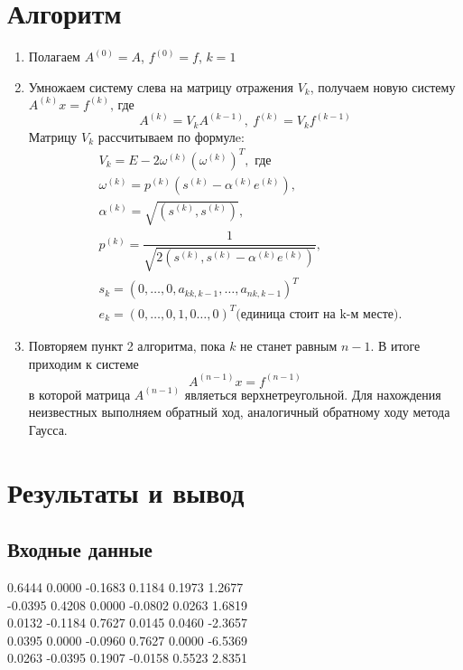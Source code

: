 \documentclass[11.4pt]{article}
\begin{document}
\section{Алгоритм}
\begin{enumerate}
	\item Полагаем $A^{(0)} = A$, $f^{(0)} = f$, $k = 1$
	\item Умножаем систему слева на матрицу отражения $V_k$, получаем новую систему $A^{(k)}x=f^{(k)}\text{, где}$
		\[A^{(k)} = V_kA^{(k-1)}, \: f^{(k)} = V_kf^{(k-1)}\]
		Матрицу $V_k$ рассчитываем по формулe:
		\begin{equation*}
			\begin{aligned}
				&V_k = E - 2\omega^{(k)} (\omega^{(k)})^{T}, \text{ где}\\
				&\omega^{(k)} = p^{(k)}(s^{(k)}-\alpha^{(k)} e^{(k)}),\\
				&\alpha^{(k)} =\sqrt{(s^{(k)}, s^{(k)})},\\
				&p^{(k)}=\dfrac{1}{\sqrt{2(s^{(k)}, s^{(k)}-\alpha^{(k)} e^{(k)})}},\\
				&s_k=(0,\ldots,0, a_{kk,k-1},\ldots,a_{nk,k-1})^T \\ &e_k=(0,\ldots,0,1,0\ldots, 0)^T  \text{(единица стоит на k-м месте)}.
			\end{aligned}
		\end{equation*}
	\item Повторяем пункт 2 алгоритма, пока $k$ не станет равным $n-1$. В итоге приходим к системе
	\[A^{(n-1)}x=f^{(n-1)}\] в которой матрица $A^{(n-1)}$ являеться верхнетреугольной.
	 Для нахождения неизвестных выполняем обратный ход, аналогичный обратному ходу метода Гаусса. 
\end{enumerate}
\section{Результаты и вывод}
	\subsection{Входные данные}
		0.6444 0.0000 -0.1683 0.1184 0.1973 1.2677\\
		-0.0395 0.4208 0.0000 -0.0802 0.0263 1.6819\\
		0.0132 -0.1184 0.7627 0.0145 0.0460 -2.3657\\
		0.0395 0.0000 -0.0960 0.7627 0.0000 -6.5369\\
		0.0263 -0.0395 0.1907 -0.0158 0.5523 2.8351\\
\end{document}
